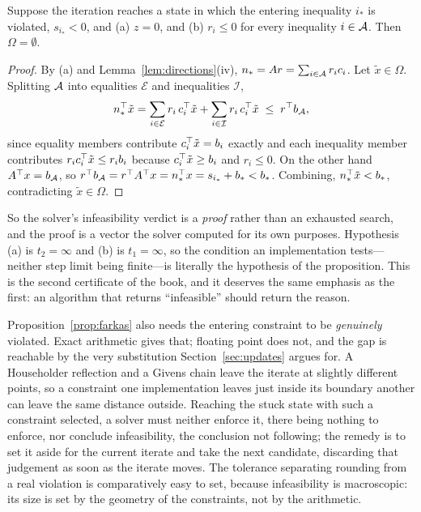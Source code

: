 \begin{proposition}
\label{prop:farkas}
Suppose the iteration reaches a state in which the entering inequality $i_*$ is
violated, $s_{i_*} < 0$, and (a) $z = 0$, and (b) $r_i \le 0$ for every inequality
$i \in \mathcal{A}$. Then $\Omega = \emptyset$.
\end{proposition}

\begin{proof}
By (a) and Lemma~\ref{lem:directions}(iv), $n_* = Ar = \sum_{i\in\mathcal{A}} r_i c_i$.
Let $\tilde x \in \Omega$. Splitting $\mathcal{A}$ into equalities $\mathcal{E}$ and
inequalities $\mathcal{I}$,
\[
  n_*^{\top} \tilde x
  = \sum_{i \in \mathcal{E}} r_i\, c_i^{\top} \tilde x
    + \sum_{i \in \mathcal{I}} r_i\, c_i^{\top} \tilde x
  \;\le\; r^{\top} b_{\mathcal{A}} ,
\]
since equality members contribute $c_i^{\top}\tilde x = b_i$ exactly and each inequality
member contributes $r_i c_i^{\top} \tilde x \le r_i b_i$ because $c_i^{\top}\tilde x \ge b_i$
and $r_i \le 0$. On the other hand $A^{\top} x = b_{\mathcal{A}}$, so
$r^{\top} b_{\mathcal{A}} = r^{\top} A^{\top} x = n_*^{\top} x = s_{i_*} + b_* < b_*$. Combining,
$n_*^{\top}\tilde x < b_*$, contradicting $\tilde x \in \Omega$.
\end{proof}

So the solver's infeasibility verdict is a \emph{proof} rather than an exhausted
search, and the proof is a vector the solver computed for its own purposes.
Hypothesis (a) is $t_2 = \infty$ and (b) is $t_1 = \infty$, so the condition an
implementation tests---neither step limit being finite---is literally the hypothesis
of the proposition. This is the second certificate of the book, and it deserves the
same emphasis as the first: an algorithm that returns ``infeasible'' should return
the reason.

\begin{remark}
\label{rem:spurious}
Proposition~\ref{prop:farkas} also needs the entering constraint to be
\emph{genuinely} violated. Exact arithmetic gives that; floating point does not,
and the gap is reachable by the very substitution Section~\ref{sec:updates} argues
for. A Householder reflection and a Givens chain leave the iterate at slightly
different points, so a constraint one implementation leaves just inside its
boundary another can leave the same distance outside. Reaching the stuck state with
such a constraint selected, a solver must neither enforce it, there being nothing
to enforce, nor conclude infeasibility, the conclusion not following; the remedy is
to set it aside for the current iterate and take the next candidate, discarding that
judgement as soon as the iterate moves. The tolerance separating rounding from a
real violation is comparatively easy to set, because infeasibility is macroscopic:
its size is set by the geometry of the constraints, not by the arithmetic.
\end{remark}

